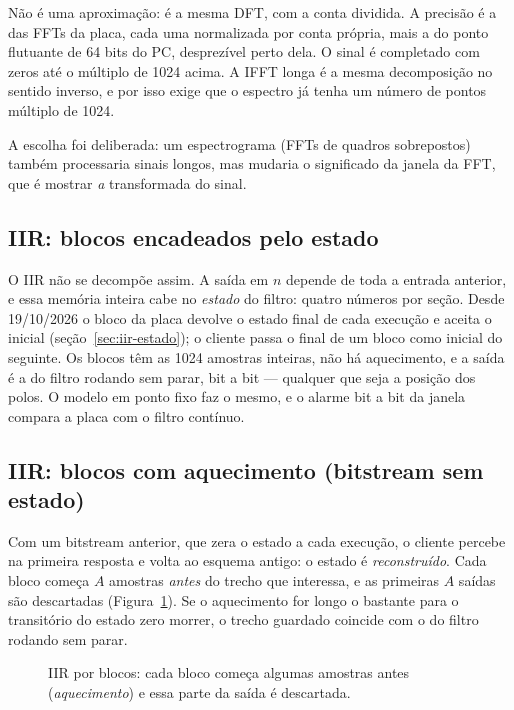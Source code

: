 Não é uma aproximação: é a mesma DFT, com a conta dividida. A precisão é a das
FFTs da placa, cada uma normalizada por conta própria, mais a do ponto
flutuante de 64 bits do PC, desprezível perto dela. O sinal é completado com
zeros até o múltiplo de 1024 acima. A IFFT longa é a mesma decomposição no
sentido inverso, e por isso exige que o espectro já tenha um número de pontos
múltiplo de 1024.

A escolha foi deliberada: um espectrograma (FFTs de quadros sobrepostos) também
processaria sinais longos, mas mudaria o significado da janela da FFT, que é
mostrar \emph{a} transformada do sinal.

\subsection{IIR: blocos encadeados pelo estado}

O IIR não se decompõe assim. A saída em \(n\) depende de toda a entrada
anterior, e essa memória inteira cabe no \emph{estado} do filtro: quatro
números por seção. Desde 19/10/2026 o bloco da placa devolve o estado final de
cada execução e aceita o inicial (seção~\ref{sec:iir-estado}); o cliente passa
o final de um bloco como inicial do seguinte. Os blocos têm as 1024 amostras
inteiras, não há aquecimento, e a saída é a do filtro rodando sem parar, bit a
bit --- qualquer que seja a posição dos polos. O modelo em ponto fixo faz o
mesmo, e o alarme bit a bit da janela compara a placa com o filtro contínuo.

\subsection{IIR: blocos com aquecimento (bitstream sem estado)}

Com um bitstream anterior, que zera o estado a cada execução, o cliente
percebe na primeira resposta e volta ao esquema antigo: o estado é
\emph{reconstruído}. Cada bloco começa \(A\) amostras \emph{antes} do trecho que interessa, e
as primeiras \(A\) saídas são descartadas (Figura~\ref{fig:iir-blocos}). Se o
aquecimento for longo o bastante para o transitório do estado zero morrer, o
trecho guardado coincide com o do filtro rodando sem parar.

\begin{figure}[htbp]
  \centering
  \caption{IIR por blocos: cada bloco começa algumas amostras antes
    (\emph{aquecimento}) e essa parte da saída é descartada.}
  \label{fig:iir-blocos}
\end{figure}

